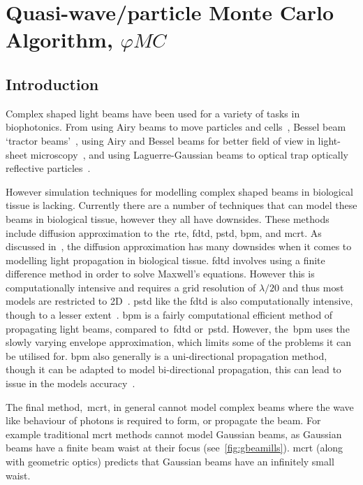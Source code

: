\chapter{Quasi-wave/particle Monte Carlo Algorithm, \texorpdfstring{$\varphi MC$}{phiMC}}\label{sec:phase}

\section{Introduction}\label{sec:besintro}

Complex shaped light beams have been used for a variety of tasks in biophotonics.
From using Airy beams to move particles and cells~\cite{baumgartl2008optically}, Bessel beam `tractor beams'~\cite{ruffner2012optical}, using Airy and Bessel beams for better field of view in light-sheet microscopy~\cite{vettenburg2014light}, and using Laguerre-Gaussian beams to optical trap optically reflective particles~\cite{simpson1996optical}.


However simulation techniques for modelling complex shaped beams in biological tissue is lacking.
Currently there are a number of techniques that can model these beams in biological tissue, however they all have downsides.
These methods include diffusion approximation to the~\gls*{rte}, \gls*{fdtd}, \gls*{pstd}, \gls*{bpm}, and \gls*{mcrt}.
As discussed in~, the diffusion approximation has many downsides when it comes to modelling light propagation in biological tissue.
\gls*{fdtd} involves using a finite difference method in order to solve Maxwell's equations.
However this is computationally intensive and requires a grid resolution of $\lambda/20$ and thus most models are restricted to 2D~\cite{glaser2016fractal,elmaklizi2015penetration}. 
\gls*{pstd} like the \gls*{fdtd} is also computationally intensive, though to a lesser extent~\cite{glaser2016fractal}.
\gls*{bpm} is a fairly computational efficient method of propagating light beams, compared to~\gls*{fdtd} or~\gls*{pstd}.
However, the~\gls*{bpm} uses the slowly varying envelope approximation, which limits some of the problems it can be utilised for.
\Gls*{bpm} also generally is a uni-directional propagation method, though it can be adapted to model bi-directional propagation, this can lead to issue in the models accuracy~\cite{van1981beam,glaser2016fractal}.

\medskip

The final method,~\gls*{mcrt}, in general cannot model complex beams where the wave like behaviour of photons is required to form, or propagate the beam.
For example traditional \gls*{mcrt} methods cannot model Gaussian beams, as Gaussian beams have a finite beam waist at their focus (see~\cref{fig:gbeamills}).
\Gls*{mcrt} (along with geometric optics) predicts that Gaussian beams have an infinitely small waist.

